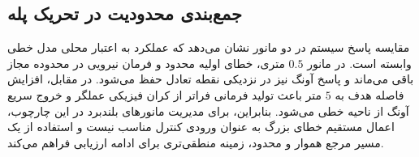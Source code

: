 \subsection{جمع‌بندی محدودیت  در تحریک پله}

مقایسه پاسخ سیستم در دو مانور نشان می‌دهد که عملکرد  به اعتبار محلی مدل خطی وابسته است. در مانور $0.5$ متری، خطای اولیه محدود و فرمان نیرویی در محدوده مجاز باقی می‌ماند و پاسخ آونگ نیز در نزدیکی نقطه تعادل حفظ می‌شود. در مقابل، افزایش فاصله هدف به $5$ متر باعث تولید فرمانی فراتر از کران فیزیکی عملگر و خروج سریع آونگ از ناحیه خطی می‌شود. بنابراین، برای مدیریت مانورهای بلندبرد در این چارچوب، اعمال مستقیم خطای بزرگ به عنوان ورودی کنترل مناسب نیست و استفاده از یک مسیر مرجع هموار و محدود، زمینه منطقی‌تری برای ادامه ارزیابی فراهم می‌کند.
